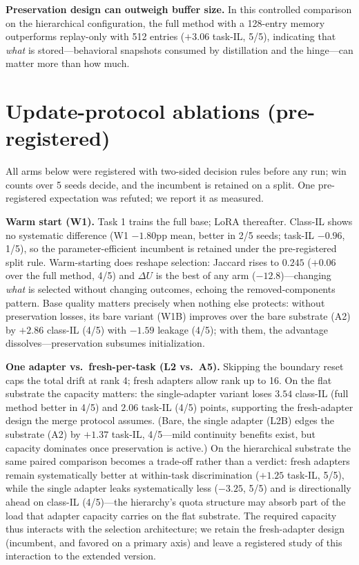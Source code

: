 \documentclass{article}
\begin{document}
\textbf{Preservation design can outweigh buffer size.} In this controlled comparison on the hierarchical configuration, the full method with a 128-entry memory outperforms replay-only with 512 entries ($+3.06$ task-IL, 5/5), indicating that \emph{what} is stored---behavioral snapshots consumed by distillation and the hinge---can matter more than how much.

\section{Update-protocol ablations (pre-registered)}
\label{sec:ablations}
All arms below were registered with two-sided decision rules before any run; win counts over 5 seeds decide, and the incumbent is retained on a split. One pre-registered expectation was refuted; we report it as measured.

\textbf{Warm start (W1).} Task 1 trains the full base; LoRA thereafter. Class-IL shows no systematic difference (W1 $-1.80$pp mean, better in 2/5 seeds; task-IL $-0.96$, 1/5), so the parameter-efficient incumbent is retained under the pre-registered split rule. Warm-starting does reshape selection: Jaccard rises to $0.245$ ($+0.06$ over the full method, 4/5) and $\Delta U$ is the best of any arm ($-12.8$)---changing \emph{what} is selected without changing outcomes, echoing the removed-components pattern. Base quality matters precisely when nothing else protects: without preservation losses, its bare variant (W1B) improves over the bare substrate (A2) by $+2.86$ class-IL (4/5) with $-1.59$ leakage (4/5); with them, the advantage dissolves---preservation subsumes initialization.

\textbf{One adapter vs.\ fresh-per-task (L2 vs.\ A5).} Skipping the boundary reset caps the total drift at rank 4; fresh adapters allow rank up to 16. On the flat substrate the capacity matters: the single-adapter variant loses $3.54$ class-IL (full method better in 4/5) and $2.06$ task-IL (4/5) points, supporting the fresh-adapter design the merge protocol assumes. (Bare, the single adapter (L2B) edges the substrate (A2) by $+1.37$ task-IL, 4/5---mild continuity benefits exist, but capacity dominates once preservation is active.) On the hierarchical substrate the same paired comparison becomes a trade-off rather than a verdict: fresh adapters remain systematically better at within-task discrimination ($+1.25$ task-IL, 5/5), while the single adapter leaks systematically less ($-3.25$, 5/5) and is directionally ahead on class-IL (4/5)---the hierarchy's quota structure may absorb part of the load that adapter capacity carries on the flat substrate. The required capacity thus interacts with the selection architecture; we retain the fresh-adapter design (incumbent, and favored on a primary axis) and leave a registered study of this interaction to the extended version.
\end{document}
